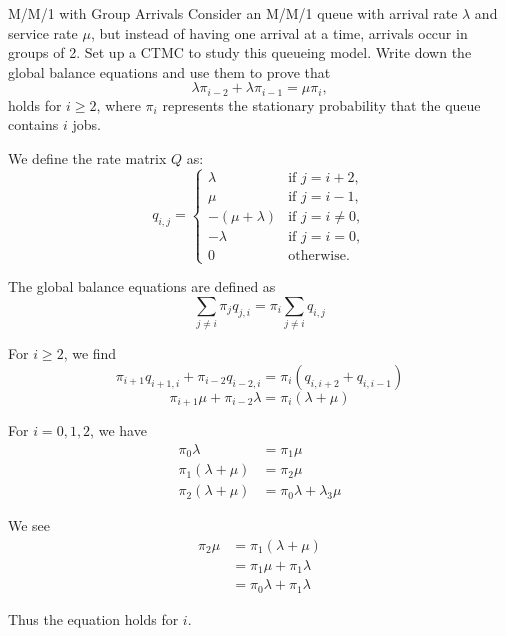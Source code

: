 \begin{problem}{M/M/1 with Group Arrivals}
Consider an M/M/1 queue with arrival rate \( \lambda \) and service rate \( \mu \), but instead of having one arrival at a time, arrivals occur in groups of 2. Set up a CTMC to study this queueing model. Write down the global balance equations and use them to prove that
   \[
   \lambda \pi_{i-2} + \lambda \pi_{i-1} = \mu \pi_i,
   \]
   holds for \( i \geq 2 \), where \( \pi_i \) represents the stationary probability that the queue contains \( i \) jobs.
\end{problem}

\begin{solution}
  We define the rate matrix \(Q\) as:
  \[
  q_{i,j} =
  \begin{cases}
    \lambda & \text{if } j = i+2, \\
    \mu & \text{if } j = i-1, \\
    -(\mu + \lambda) & \text{if } j = i \neq 0, \\
    -\lambda & \text{if } j = i = 0, \\
    0 & \text{otherwise.}
  \end{cases}
  \]

  The global balance equations are defined as
  \[
    \sum_{j\neq i} \pi_jq_{j,i}=\pi_i\sum_{j\neq i}q_{i,j}
  \]

  For $i\geq 2$, we find
  \[
    \pi_{i+1}q_{i+1,i} + \pi_{i-2}q_{i-2,i}=\pi_i(q_{i,i+2} + q_{i,i-1})
  \]
  \[
    \pi_{i+1}\mu + \pi_{i-2}\lambda = \pi_i(\lambda + \mu)
  \]

  For $i={0,1,2}$, we have
  \begin{align*}
    \pi_0\lambda &= \pi_1\mu \\
    \pi_1(\lambda+\mu) &= \pi_2\mu\\
    \pi_2(\lambda+\mu) &= \pi_0\lambda + \lambda_3\mu
  \end{align*}

  We see
  \begin{align*}
    \pi_2\mu  &= \pi_1(\lambda+\mu) \\
              &= \pi_1\mu  + \pi_1\lambda\\
              &= \pi_0\lambda  + \pi_1\lambda
  \end{align*}

  Thus the equation holds for $i$.


\end{solution}
